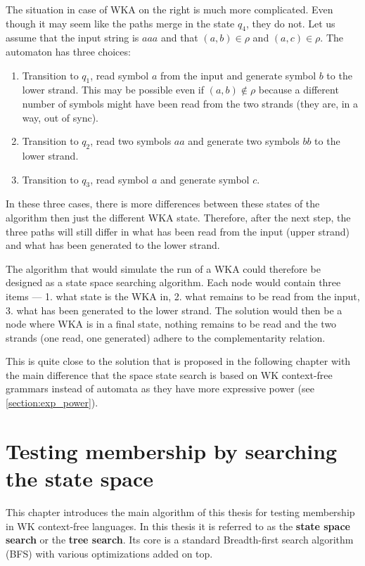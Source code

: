 The situation in case of WKA on the right is much more complicated. Even though it may seem like the paths merge in the state $q_4$, they do not. Let us assume that the input string is $aaa$ and that $(a, b) \in \rho$ and $(a, c) \in \rho$. The automaton has three choices:

\begin{enumerate}
  \item{Transition to $q_1$, read symbol $a$ from the input and generate symbol $b$ to the lower strand. This may be possible even if $(a, b) \notin \rho$ because a different number of symbols might have been read from the two strands (they are, in a way, out of sync).}

  \item{Transition to $q_2$, read two symbols $aa$ and generate two symbols $bb$ to the lower strand.}

  \item{Transition to $q_3$, read symbol $a$ and generate symbol $c$.}
\end{enumerate}

In these three cases, there is more differences between these states of the algorithm then just the different WKA state. Therefore, after the next step, the three paths will still differ in what has been read from the input (upper strand) and what has been generated to the lower strand.

The algorithm that would simulate the run of a WKA could therefore be designed as a state space searching algorithm. Each node would contain three items --- 1. what state is the WKA in, 2. what remains to be read from the input, 3. what has been generated to the lower strand. The solution would then be a node where WKA is in a final state, nothing remains to be read and the two strands (one read, one generated) adhere to the complementarity relation.

This is quite close to the solution that is proposed in the following chapter with the main difference that the space state search is based on WK context-free grammars instead of automata as they have more expressive power (see \ref{section:exp_power}).

\chapter{Testing membership by searching the state space} \label{chapter:parse_tree}
This chapter introduces the main algorithm of this thesis for testing membership in WK context-free languages. In this thesis it is referred to as the \textbf{state space search} or the \textbf{tree search}. Its core is a standard Breadth-first search algorithm (BFS) with various optimizations added on top.

